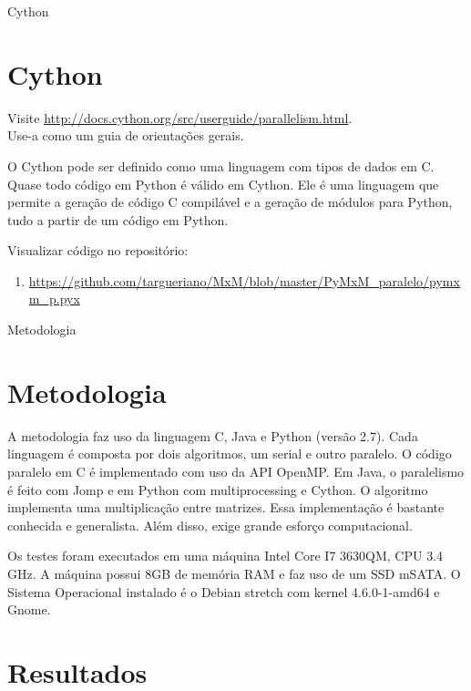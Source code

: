 \documentclass[aspectratio=169]{beamer}
\begin{document}
\begin{frame}{Cython}
\section{Cython}

Visite \url{http://docs.cython.org/src/userguide/parallelism.html}.\\ 
Use-a como um guia de orientações gerais.
\vspace{0.7cm}

O Cython pode ser definido como uma linguagem com tipos de dados em C. Quase todo código em Python é válido em Cython. Ele é uma linguagem que permite a geração de código C compilável e a geração de módulos para Python, tudo a partir de um código em Python. 

Visualizar código no repositório:
\begin{enumerate}
 \item \url{https://github.com/targueriano/MxM/blob/master/PyMxM_paralelo/pymxm_p.pyx}
\end{enumerate}


\end{frame}

\begin{frame}{Metodologia}
\section{Metodologia}

A metodologia faz uso da linguagem C, Java e Python (versão 2.7). Cada linguagem é composta por dois algoritmos, um serial e outro paralelo. O código paralelo em C é implementado com uso da API OpenMP. Em Java, o paralelismo é feito com Jomp e em Python com multiprocessing e Cython. 
O algoritmo implementa uma multiplicação entre matrizes. Essa implementação é bastante conhecida e generalista. Além disso, exige grande esforço computacional.

Os testes foram executados em uma máquina Intel Core I7 3630QM, CPU 3.4 GHz. A máquina possui 8GB de memória RAM e faz uso de um SSD mSATA. O Sistema Operacional instalado é o Debian stretch com kernel 4.6.0-1-amd64 e Gnome.

\end{frame}

\section{Resultados}
\end{document}

